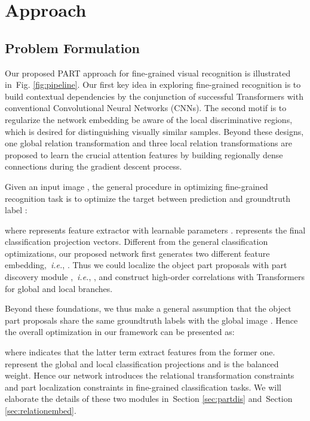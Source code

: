 \documentclass[journal]{IEEEtran}
\def\ie{{\em i.e.}}
\newcommand{\figref}[1]{Fig. \ref{#1}}
\newcommand{\secref}[1]{Section \ref{#1}}
\begin{document}
\section{Approach}\label{sec:method}
\subsection{Problem Formulation}\label{sec:formulate}
Our proposed PART approach for fine-grained visual recognition is illustrated in~\figref{fig:pipeline}. Our first key idea in exploring fine-grained recognition is to build contextual dependencies by the conjunction of successful Transformers with conventional Convolutional Neural Networks (CNNs). The second motif is to regularize the network embedding be aware of the local discriminative regions, which is desired for distinguishing visually similar samples. Beyond these designs, one global relation transformation and three local relation transformations are proposed to learn the crucial attention features by building regionally dense connections during the gradient descent process.

Given an input image , the general procedure in optimizing fine-grained recognition task is to optimize the target  between prediction and groundtruth label :

where  represents feature extractor  with learnable parameters .  represents the final classification projection vectors. Different from the general classification optimizations, our proposed network first generates two different feature embedding,~\ie, . Thus we could localize the object part proposals  with part discovery module ,~\ie, , and construct high-order correlations with Transformers  for global and local branches.

Beyond these foundations, we thus make a general assumption that the object part proposals  share the same groundtruth labels  with the global image . Hence the overall optimization in our framework can be presented as:

where  indicates that the latter term extract features from the former one.  represent the global and local classification projections and  is the balanced weight.
Hence our network introduces the relational transformation constraints and part localization constraints in fine-grained classification tasks. We will elaborate the details of these two modules in~\secref{sec:partdis} and~\secref{sec:relationembed}.
\end{document}
